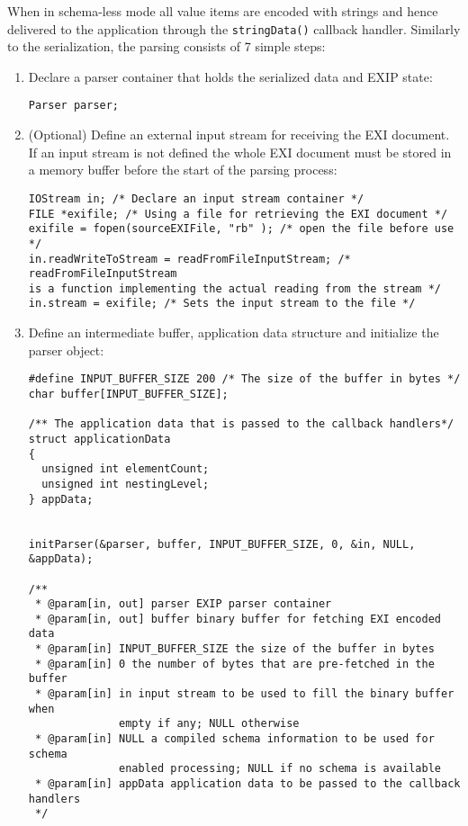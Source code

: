 When in schema-less mode all value items are encoded with strings and hence
delivered to the application through the \texttt{stringData()} callback handler.
Similarly to the serialization, the parsing consists of 7 simple steps:
\begin{enumerate}
 \item Declare a parser container that holds the serialized data and EXIP state:
\begin{lstlisting}
Parser parser;
\end{lstlisting}

 \item (Optional) Define an external input stream for receiving the EXI document. If an input stream
is not defined the whole EXI document must be stored in a memory buffer before the start of the
parsing process:
\begin{lstlisting}
IOStream in; /* Declare an input stream container */
FILE *exifile; /* Using a file for retrieving the EXI document */
exifile = fopen(sourceEXIFile, "rb" ); /* open the file before use */
in.readWriteToStream = readFromFileInputStream; /* readFromFileInputStream
is a function implementing the actual reading from the stream */
in.stream = exifile; /* Sets the input stream to the file */
\end{lstlisting}

 \item Define an intermediate buffer, application data structure and initialize the parser object:
\begin{lstlisting}
#define INPUT_BUFFER_SIZE 200 /* The size of the buffer in bytes */
char buffer[INPUT_BUFFER_SIZE];

/** The application data that is passed to the callback handlers*/
struct applicationData
{
  unsigned int elementCount;
  unsigned int nestingLevel;
} appData;


initParser(&parser, buffer, INPUT_BUFFER_SIZE, 0, &in, NULL, &appData);

/**
 * @param[in, out] parser EXIP parser container
 * @param[in, out] buffer binary buffer for fetching EXI encoded data
 * @param[in] INPUT_BUFFER_SIZE the size of the buffer in bytes
 * @param[in] 0 the number of bytes that are pre-fetched in the buffer
 * @param[in] in input stream to be used to fill the binary buffer when
		      empty if any; NULL otherwise
 * @param[in] NULL a compiled schema information to be used for schema
		      enabled processing; NULL if no schema is available
 * @param[in] appData application data to be passed to the callback handlers
 */      
\end{lstlisting}


\end{enumerate}
